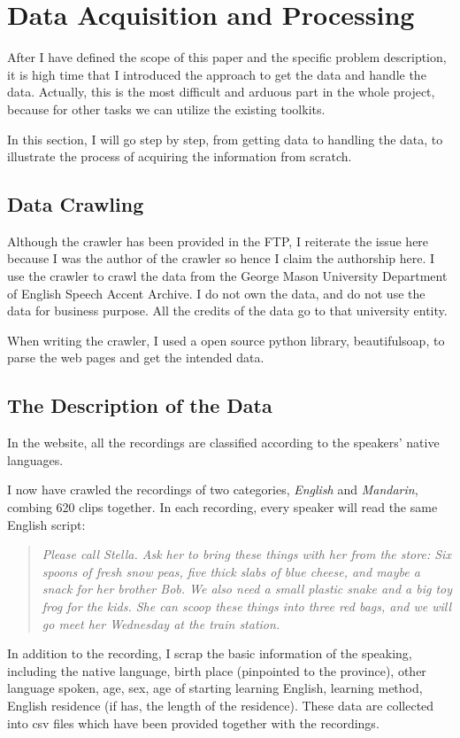 \documentclass{sig-alternate}
\begin{document}
\section{Data Acquisition and Processing}
After I have defined the scope of this paper and the specific problem description, it is high time that I introduced the approach to get the data and handle the data. Actually, this is the most difficult and arduous part in the whole project, because for other tasks we can utilize the existing toolkits.

In this section, I will go step by step, from getting data to handling the data, to illustrate the process of acquiring the information from scratch.
\subsection{Data Crawling}
Although the crawler has been provided in the FTP, I reiterate the issue here because I was the author of the crawler so hence I claim the authorship here. I use the crawler to crawl the data from the George Mason University Department of English Speech Accent Archive\cite{accent}. I do not own the data, and do not use the data for business purpose. All the credits of the data go to that university entity.

When writing the crawler, I used a open source python library, beautifulsoap\cite{bs}, to parse the web pages and get the intended data.

\subsection{The Description of the Data}
In the website, all the recordings are classified according to the speakers' native languages.

I now have crawled the recordings of two categories, \emph{English} and \emph{Mandarin}, combing 620 clips together. In each recording, every speaker will read the same English script:
\begin{quote}\emph{
Please call Stella. Ask her to bring these things with her from the store: Six spoons of fresh snow peas, five thick slabs of blue cheese, and maybe a snack for her brother Bob. We also need a small plastic snake and a big toy frog for the kids. She can scoop these things into three red bags, and we will go meet her Wednesday at the train station.}
\end{quote}

In addition to the recording, I scrap the basic information of the speaking, including the native language, birth place (pinpointed to the province), other language spoken, age, sex, age of starting learning English, learning method, English residence (if has, the length of the residence). These data are collected into csv files which have been provided together with the recordings.
\end{document}
